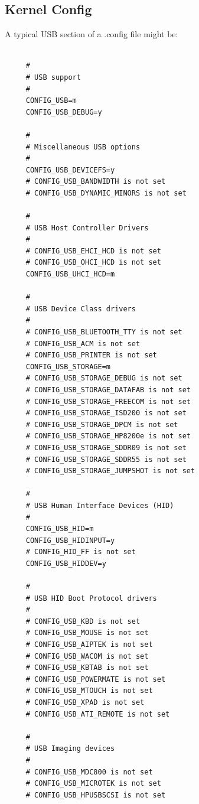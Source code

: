 {{{{{{{{{{{{{{{{{\label{Kernel-Config}

\subsection*{Kernel Config}

A typical USB section of a .config file might be:  

\label{index-Kernel-config-265}
\label{index-config_002c-Kernel-266}

\footnotesize
\begin{verbatim}
     
     #
     # USB support
     #
     CONFIG_USB=m
     CONFIG_USB_DEBUG=y
     
     #
     # Miscellaneous USB options
     #
     CONFIG_USB_DEVICEFS=y
     # CONFIG_USB_BANDWIDTH is not set
     # CONFIG_USB_DYNAMIC_MINORS is not set
     
     #
     # USB Host Controller Drivers
     #
     # CONFIG_USB_EHCI_HCD is not set
     # CONFIG_USB_OHCI_HCD is not set
     CONFIG_USB_UHCI_HCD=m
     
     #
     # USB Device Class drivers
     #
     # CONFIG_USB_BLUETOOTH_TTY is not set
     # CONFIG_USB_ACM is not set
     # CONFIG_USB_PRINTER is not set
     CONFIG_USB_STORAGE=m
     # CONFIG_USB_STORAGE_DEBUG is not set
     # CONFIG_USB_STORAGE_DATAFAB is not set
     # CONFIG_USB_STORAGE_FREECOM is not set
     # CONFIG_USB_STORAGE_ISD200 is not set
     # CONFIG_USB_STORAGE_DPCM is not set
     # CONFIG_USB_STORAGE_HP8200e is not set
     # CONFIG_USB_STORAGE_SDDR09 is not set
     # CONFIG_USB_STORAGE_SDDR55 is not set
     # CONFIG_USB_STORAGE_JUMPSHOT is not set
     
     #
     # USB Human Interface Devices (HID)
     #
     CONFIG_USB_HID=m
     CONFIG_USB_HIDINPUT=y
     # CONFIG_HID_FF is not set
     CONFIG_USB_HIDDEV=y
     
     #
     # USB HID Boot Protocol drivers
     #
     # CONFIG_USB_KBD is not set
     # CONFIG_USB_MOUSE is not set
     # CONFIG_USB_AIPTEK is not set
     # CONFIG_USB_WACOM is not set
     # CONFIG_USB_KBTAB is not set
     # CONFIG_USB_POWERMATE is not set
     # CONFIG_USB_MTOUCH is not set
     # CONFIG_USB_XPAD is not set
     # CONFIG_USB_ATI_REMOTE is not set
     
     #
     # USB Imaging devices
     #
     # CONFIG_USB_MDC800 is not set
     # CONFIG_USB_MICROTEK is not set
     # CONFIG_USB_HPUSBSCSI is not set
     

\end{verbatim}}}}}}}}}}}}}}}}}}
